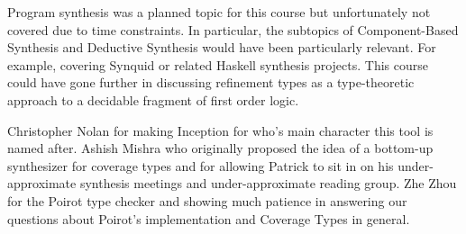 \documentclass[review, sigplan]{acmart}
\begin{document}
Program synthesis was a planned topic for this course but unfortunately not
covered due to time constraints. In particular, the subtopics of Component-Based
Synthesis and Deductive Synthesis would have been particularly relevant. For
example, covering Synquid or related Haskell synthesis projects. This course
could have gone further in discussing refinement types as a type-theoretic
approach to a decidable fragment of first order logic.

\begin{acks}
  Christopher Nolan for making Inception for who's main character this tool is
  named after.
  Ashish Mishra who originally proposed the idea of a bottom-up synthesizer
  for coverage types and for allowing Patrick to sit in on his
  under-approximate synthesis meetings and under-approximate reading group.
  Zhe Zhou for the Poirot type checker and showing much patience in answering
  our questions about Poirot's implementation and Coverage Types in general.
\end{acks}



\end{document}
